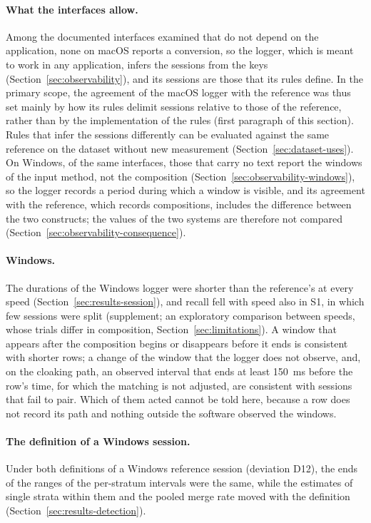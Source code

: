 \paragraph{What the interfaces allow.} Among the documented interfaces examined that do not depend on the application,
none on macOS reports a conversion, so the logger, which is meant to work in any application, infers the sessions from
the keys (Section~\ref{sec:observability}), and its sessions are those that its rules define. In the primary scope, the
agreement of the macOS logger with the reference was thus set mainly by how its rules delimit sessions relative to
those of the reference, rather than by the implementation of the rules (first paragraph of this section). Rules that
infer the sessions differently can be evaluated against the same reference on the dataset without new measurement
(Section~\ref{sec:dataset-uses}). On Windows, of the same interfaces, those that carry no text report the windows of
the input method, not the composition (Section~\ref{sec:observability-windows}), so the logger records a period during
which a window is visible, and its agreement with the reference, which records compositions, includes the difference
between the two constructs; the values of the two systems are therefore not compared
(Section~\ref{sec:observability-consequence}).

\paragraph{Windows.} The durations of the Windows logger were shorter than the reference's at every speed
(Section~\ref{sec:results-session}), and recall fell with speed also in S1, in which few sessions were split
(supplement; an exploratory comparison between speeds, whose trials differ in composition,
Section~\ref{sec:limitations}). A window that appears after the composition begins or disappears before it ends is
consistent with shorter rows; a change of the window that the logger does not observe, and, on the cloaking path, an
observed interval that ends at least 150~ms before the row's time, for which the matching is not adjusted, are
consistent with sessions that fail to pair. Which of them acted cannot be told here, because a row does not record its
path and nothing outside the software observed the windows.

\paragraph{The definition of a Windows session.} Under both definitions of a Windows reference session (deviation D12),
the ends of the ranges of the per-stratum intervals were the same, while the estimates of single strata within them
and the pooled merge rate moved with the definition (Section~\ref{sec:results-detection}).

